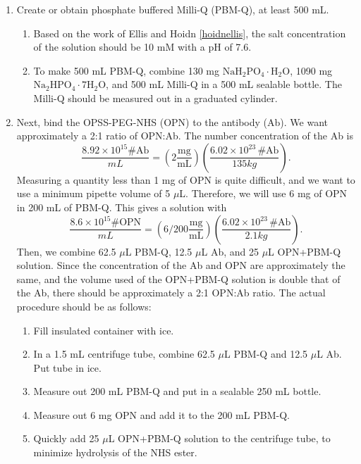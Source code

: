 \begin{enumerate}
\item Create or obtain phosphate buffered Milli-Q (PBM-Q), at least 500 mL.

\begin{enumerate}
\item Based on the work of Ellis and Hoidn \autoref{hoidnellis}, the salt concentration of the solution should be 10 mM with a pH of 7.6.

\item To make 500 mL PBM-Q, combine 130 mg $\mathrm{NaH_2PO_4\cdot H_2O}$, 1090 mg $\mathrm{Na_2HPO_4\cdot7H_2O}$, and 500 mL Milli-Q in a 500 mL sealable bottle. The Milli-Q should be measured out in a graduated cylinder.

\end{enumerate}

\item Next, bind the OPSS-PEG-NHS (OPN) to the antibody (Ab). We want approximately a 2:1 ratio of OPN:Ab. The number concentration of the Ab is \[\frac{8.92\times10^{15}\#\mathrm{Ab}}{mL}=\left(2\mathrm{\frac{mg}{mL}}\right)\left(\frac{6.02\times10^{23}\,\#\mathrm{Ab}}{135 kg}\right).\]
Measuring a quantity less than 1 mg of OPN is quite difficult, and we want to use a minimum pipette volume of 5 $\mu$L. Therefore, we will use 6 mg of OPN in 200 mL of PBM-Q. This gives a solution with
\[\frac{8.6\times10^{15}\#\mathrm{OPN}}{mL}=\left(6/200\mathrm{\frac{mg}{mL}}\right)\left(\frac{6.02\times10^{23}\,\#\mathrm{Ab}}{2.1 kg}\right).\]
Then, we combine 62.5 $\mu$L PBM-Q, 12.5 $\mu$L Ab, and 25 $\mu$L OPN+PBM-Q solution. Since the concentration of the Ab and OPN are approximately the same, and the volume used of the OPN+PBM-Q solution is double that of the Ab, there should be approximately a 2:1 OPN:Ab ratio. The actual procedure should be as follows:

\begin{enumerate}
\item Fill insulated container with ice.

\item In a 1.5 mL centrifuge tube, combine 62.5 $\mu$L PBM-Q and 12.5 $\mu$L Ab. Put tube in ice.

\item Measure out 200 mL PBM-Q and put in a sealable 250 mL bottle.

\item Measure out 6 mg OPN and add it to the 200 mL PBM-Q.

\item Quickly add 25 $\mu$L OPN+PBM-Q solution to the centrifuge tube, to minimize hydrolysis of the NHS ester.


\end{enumerate}
\end{enumerate}

